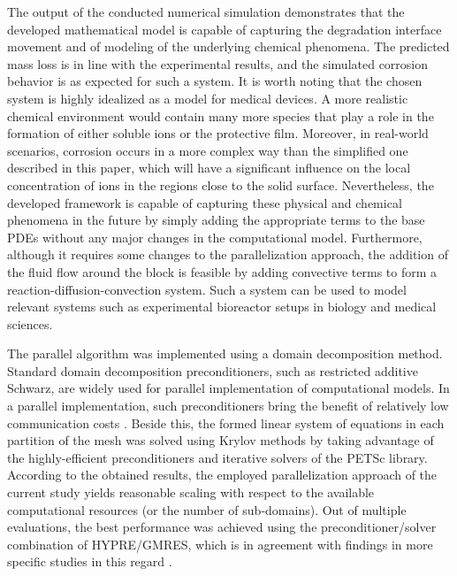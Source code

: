 The output of the conducted numerical simulation demonstrates that the developed mathematical model is capable of capturing the degradation interface movement and of modeling of the underlying chemical phenomena. The predicted mass loss is in line with the experimental results, and the simulated corrosion behavior is as expected for such a system. It is worth noting that the chosen system is highly idealized as a model for medical devices. A more realistic chemical environment would contain many more species that play a role in the formation of either soluble ions or the protective film. Moreover, in real-world scenarios, corrosion occurs in a more complex way than the simplified one described in this paper, which will have a significant influence on the local concentration of ions in the regions close to the solid surface. Nevertheless, the developed framework is capable of capturing these physical and chemical phenomena in the future by simply adding the appropriate terms to the base \gls{PDE}s without any major changes in the computational model. Furthermore, although it requires some changes to the parallelization approach, the addition of the fluid flow around the block is feasible by adding convective terms to form a reaction-diffusion-convection system. Such a system can be used to model relevant systems such as experimental bioreactor setups in biology and medical sciences.

The parallel algorithm was implemented using a domain decomposition method. Standard domain decomposition preconditioners, such as restricted additive Schwarz, are widely used for parallel implementation of computational models. In a parallel implementation, such preconditioners bring the benefit of relatively low communication costs \cite{Daas2019AMS}. Beside this, the formed linear system of equations in each partition of the mesh was solved using Krylov methods by taking advantage of the highly-efficient preconditioners and iterative solvers of the \gls{PETSc} library. According to the obtained results, the employed parallelization approach of the current study yields reasonable scaling with respect to the available computational resources (or the number of sub-domains). Out of multiple evaluations, the best performance was achieved using the preconditioner/solver combination of HYPRE/\gls{GMRES}, which is in agreement with findings in more specific studies in this regard \cite{Ghai2018}.


